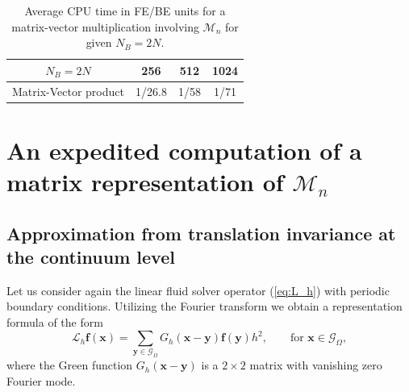 \documentclass[preprint,12pt]{elsarticle}
\begin{document}
\begin{table}
\begin{center}
\begin{tabular}{|c|c c c|}
\hline
$N_B=2N$ &  256  & 512 & 1024\\
\hline
\textrm{Matrix-Vector product} 
& 1/26.8  & 1/58 &  1/71\\
\hline
\end{tabular}
\end{center}
\caption{Average CPU time in FE/BE units for a matrix-vector multiplication involving $\mathcal{M}_n$ for given $N_B=2N$.}
\label{Table:MV}
\end{table}


\section{An expedited computation of a matrix representation of $\mathcal{M}_n$}
\label{Sec:matrix}
\subsection{Approximation from translation invariance at the continuum level}
Let us consider again the linear fluid solver operator (\ref{eq:L_h}) with periodic boundary conditions. Utilizing the Fourier transform we obtain a representation formula of the form
\begin{equation}
 \mathcal{L}_h \mathbf{f}(\mathbf{x}) = \sum_{\mathbf{y} \in \mathcal{G}_\Omega} G_h (\mathbf{x}-\mathbf{y})\mathbf{f}(\mathbf{y})h^2, \qquad \text{for $\mathbf{x} \in \mathcal{G}_\Omega$},
\label{eq:G_h}
\end{equation}
where the Green function $ G_h (\mathbf{x}-\mathbf{y})$ is a $2 \times 2$ matrix with vanishing zero Fourier mode. 
\end{document}
